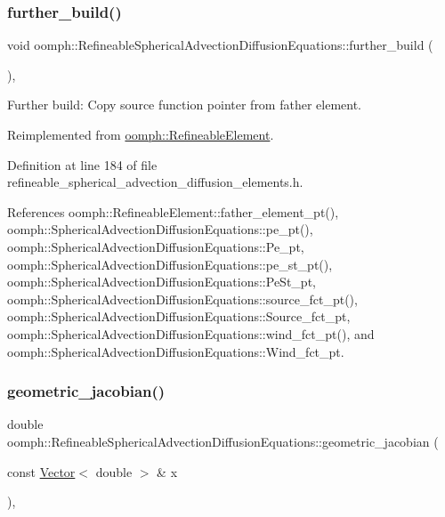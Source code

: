\subsubsection{\texorpdfstring{further\+\_\+build()}{further\_build()}}
{\footnotesize\ttfamily void oomph\+::\+Refineable\+Spherical\+Advection\+Diffusion\+Equations\+::further\+\_\+build (\begin{DoxyParamCaption}{ }\end{DoxyParamCaption})\hspace{0.3cm}{\ttfamily [inline]}, {\ttfamily [virtual]}}



Further build\+: Copy source function pointer from father element. 



Reimplemented from \hyperlink{classoomph_1_1RefineableElement_a26628ce36dfad028686adeb4694a9ef3}{oomph\+::\+Refineable\+Element}.



Definition at line 184 of file refineable\+\_\+spherical\+\_\+advection\+\_\+diffusion\+\_\+elements.\+h.



References oomph\+::\+Refineable\+Element\+::father\+\_\+element\+\_\+pt(), oomph\+::\+Spherical\+Advection\+Diffusion\+Equations\+::pe\+\_\+pt(), oomph\+::\+Spherical\+Advection\+Diffusion\+Equations\+::\+Pe\+\_\+pt, oomph\+::\+Spherical\+Advection\+Diffusion\+Equations\+::pe\+\_\+st\+\_\+pt(), oomph\+::\+Spherical\+Advection\+Diffusion\+Equations\+::\+Pe\+St\+\_\+pt, oomph\+::\+Spherical\+Advection\+Diffusion\+Equations\+::source\+\_\+fct\+\_\+pt(), oomph\+::\+Spherical\+Advection\+Diffusion\+Equations\+::\+Source\+\_\+fct\+\_\+pt, oomph\+::\+Spherical\+Advection\+Diffusion\+Equations\+::wind\+\_\+fct\+\_\+pt(), and oomph\+::\+Spherical\+Advection\+Diffusion\+Equations\+::\+Wind\+\_\+fct\+\_\+pt.

\mbox{\label{classoomph_1_1RefineableSphericalAdvectionDiffusionEquations_addfcf580759ab8cf263c8e00acd31953}} 
\subsubsection{\texorpdfstring{geometric\+\_\+jacobian()}{geometric\_jacobian()}}
{\footnotesize\ttfamily double oomph\+::\+Refineable\+Spherical\+Advection\+Diffusion\+Equations\+::geometric\+\_\+jacobian (\begin{DoxyParamCaption}\item[{const \hyperlink{classoomph_1_1Vector}{Vector}$<$ double $>$ \&}]{x }\end{DoxyParamCaption})\hspace{0.3cm}{\ttfamily [inline]}, {\ttfamily [virtual]}}



